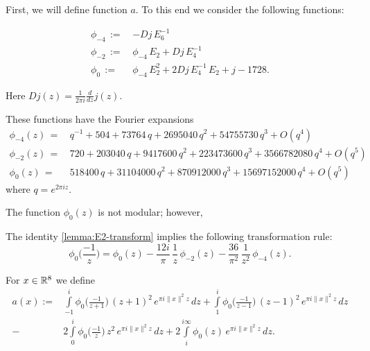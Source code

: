 First, we will define function $a$. To this end we consider the following functions:
\begin{definition}\label{def: phi4 phi2 phi0}
\begin{align}
  \phi_{-4}\,:= \,& -Dj\,E_6^{-1}\label{eqn: def phi4}\\
  \phi_{-2}\,:= \,&\phi_{-4}\,E_2+Dj\,E_4^{-1}\label{eqn: def phi2}\\
  \phi_{0}\,:= \,&\phi_{-4}\,E_2^2+2Dj\,E_4^{-1}\,E_2+j-1728.\label{eqn: def phi0}
\end{align}
\end{definition}
Here $Dj(z)=\frac{1}{2\pi i} \frac{d}{dz} j(z)$.
\begin{lemma}\label{lemma: phi fourier4 phi fourier2 phi fourier0}
  These functions have the Fourier expansions
\begin{align}
  \phi_{-4}(z)\,=\,&q^{-1} + 504 + 73764\, q + 2695040\, q^2 + 54755730\, q^3 + O(q^4)\label{eqn: phi fourier4}\\
  \phi_{-2}(z)\,=\,&720 + 203040\, q + 9417600\, q^2 + 223473600\, q^3 + 3566782080\, q^4+O(q^5)\label{eqn: phi fourier2}\\
  \phi_{0}(z)\,=\,&518400\, q + 31104000\, q^2 + 870912000\, q^3 + 15697152000\, q^4+O(q^5)\label{eqn: phi fourier0}
\end{align}
where $q=e^{2\pi i z}$.
\end{lemma}
The function $\phi_0(z)$ is not modular; however,
\begin{lemma}\label{lemma: phi0 transform}
  The identity \ref{lemma:E2-transform} implies the following transformation rule:
\begin{equation}\label{eqn: phi0 transform}
\phi_0\Big(\frac{-1}{z}\Big)=\phi_0(z)-\frac{12i}{\pi}\,\frac{1}{z}\,\phi_{-2}(z)-\frac{36}{\pi^2}\,\frac{1}{z^2}\,\phi_{-4}(z).
\end{equation}
\end{lemma}
\begin{definition}\label{def: a(r) definition}
For $x\in\mathbb{R}^8$ we define
\begin{align}\label{eqn: a(r) definition}
  a(x):=&\int\limits_{-1}^i\phi_0\Big(\frac{-1}{z+1}\Big)\,(z+1)^2\,e^{\pi i \|x\|^2 z}\,dz
  +\int\limits_{1}^i\phi_0\Big(\frac{-1}{z-1}\Big)\,(z-1)^2\,e^{\pi i \|x\|^2 z}\,dz\\
  -&2\int\limits_{0}^i\phi_0\Big(\frac{-1}{z}\Big)\,z^2\,e^{\pi i \|x\|^2 z}\,dz
  +2\int\limits_{i}^{i\infty}\phi_0(z)\,e^{\pi i \|x\|^2 z}\,dz.\nonumber
\end{align}
\end{definition}
